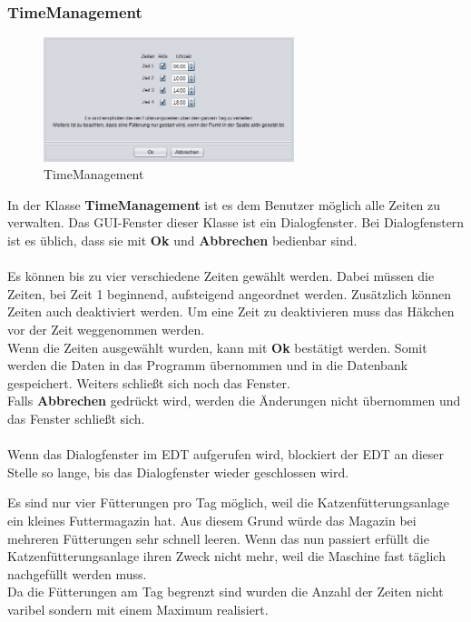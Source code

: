 \subsubsection{TimeManagement}\label{subsubsec:TimeManagement}
\begin{figure}
\vspace{-20pt}
  \begin{center}
    \includegraphics[width=0.65\textwidth]{Bilder/GUI/TimeManagement}
  \end{center}
  \caption{TimeManagement}
  \label{TimeManagement}
  \vspace{0pt}
\end{figure}
In der Klasse \textbf{TimeManagement} ist es dem Benutzer möglich alle Zeiten zu verwalten. Das GUI-Fenster dieser Klasse ist ein Dialogfenster. Bei Dialogfenstern ist es üblich, dass sie mit \textbf{Ok} und \textbf{Abbrechen} bedienbar sind.
\\ \\ Es können bis zu vier verschiedene Zeiten gewählt werden. Dabei müssen die Zeiten, bei Zeit 1 beginnend, aufsteigend angeordnet werden. Zusätzlich können Zeiten auch deaktiviert werden. Um eine Zeit zu deaktivieren muss das Häkchen vor der Zeit weggenommen werden.
\\ Wenn die Zeiten ausgewählt wurden, kann mit \textbf{Ok} bestätigt werden. Somit werden die Daten in das Programm übernommen und in die Datenbank gespeichert. Weiters schließt sich noch das Fenster.
\\ Falls \textbf{Abbrechen} gedrückt wird, werden die Änderungen nicht übernommen und das Fenster schließt sich.
\\ \\ Wenn das Dialogfenster im EDT aufgerufen wird, blockiert der EDT an dieser Stelle so lange, bis das Dialogfenster wieder geschlossen wird.

\vspace{10pt}

Es sind nur vier Fütterungen pro Tag möglich, weil die Katzenfütterungsanlage ein kleines Futtermagazin hat. Aus diesem Grund würde das Magazin bei mehreren Fütterungen sehr schnell leeren. Wenn das nun passiert erfüllt die Katzenfütterungsanlage ihren Zweck nicht mehr, weil die Maschine fast täglich nachgefüllt werden muss.
\\ Da die Fütterungen am Tag begrenzt sind wurden die Anzahl der Zeiten nicht varibel sondern mit einem Maximum realisiert.

